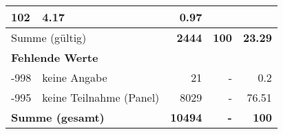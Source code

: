\begin{longtable}{lXrrr}
       \num{102} &
       \num[round-mode=places,round-precision=2]{4.17} &
         \num[round-mode=places,round-precision=2]{0.97} \\
     \midrule
     \multicolumn{2}{l}{Summe (gültig)} &
       \textbf{\num{2444}} &
     \textbf{\num{100}} &
       \textbf{\num[round-mode=places,round-precision=2]{23.29}} \\
     \multicolumn{5}{l}{\textbf{Fehlende Werte}}\\
       -998 &
       keine Angabe &
         \num{21} &
        - &
         \num[round-mode=places,round-precision=2]{0.2} \\
       -995 &
       keine Teilnahme (Panel) &
         \num{8029} &
        - &
         \num[round-mode=places,round-precision=2]{76.51} \\
     \midrule
     \multicolumn{2}{l}{\textbf{Summe (gesamt)}} &
          \textbf{\num{10494}} &
        \textbf{-} &
        \textbf{\num{100}} \\
     \bottomrule
     \end{longtable}
     
